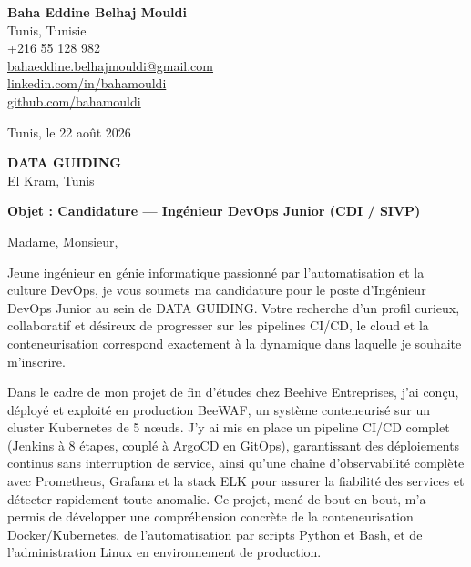 \documentclass[a4paper,11pt]{article}
\begin{document}
\begin{flushright}
{\bfseries Baha Eddine Belhaj Mouldi}\\
Tunis, Tunisie\\
+216 55 128 982\\
\href{mailto:bahaeddine.belhajmouldi@gmail.com}{bahaeddine.belhajmouldi@gmail.com}\\
\href{https://linkedin.com/in/bahamouldi}{linkedin.com/in/bahamouldi}\\
\href{https://github.com/bahamouldi}{github.com/bahamouldi}
\end{flushright}

\vspace{0.8cm}

\begin{flushleft}
Tunis, le 22 août 2026

\vspace{0.8cm}

{\bfseries DATA GUIDING}\\
El Kram, Tunis

\vspace{0.6cm}

{\bfseries Objet : Candidature --- Ingénieur DevOps Junior (CDI / SIVP)}
\end{flushleft}

\vspace{0.6cm}

Madame, Monsieur,

Jeune ingénieur en génie informatique passionné par l'automatisation et la culture DevOps, je vous soumets ma candidature pour le poste d'Ingénieur DevOps Junior au sein de DATA GUIDING. Votre recherche d'un profil curieux, collaboratif et désireux de progresser sur les pipelines CI/CD, le cloud et la conteneurisation correspond exactement à la dynamique dans laquelle je souhaite m'inscrire.

Dans le cadre de mon projet de fin d'études chez Beehive Entreprises, j'ai conçu, déployé et exploité en production BeeWAF, un système conteneurisé sur un cluster Kubernetes de 5 nœuds. J'y ai mis en place un pipeline CI/CD complet (Jenkins à 8 étapes, couplé à ArgoCD en GitOps), garantissant des déploiements continus sans interruption de service, ainsi qu'une chaîne d'observabilité complète avec Prometheus, Grafana et la stack ELK pour assurer la fiabilité des services et détecter rapidement toute anomalie. Ce projet, mené de bout en bout, m'a permis de développer une compréhension concrète de la conteneurisation Docker/Kubernetes, de l'automatisation par scripts Python et Bash, et de l'administration Linux en environnement de production.
\end{document}

